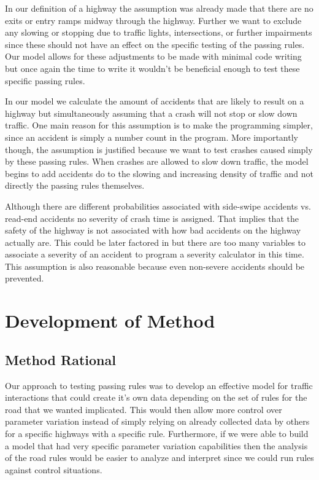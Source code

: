 \documentclass{amsart}
\begin{document}
		 In our definition of a highway the assumption was already made that there are no exits or entry ramps midway through the highway.  Further we want to exclude any slowing or stopping due to traffic lights, intersections, or further impairments since these should not have an effect on the specific testing of the passing rules.  Our model allows for these adjustments to be made with minimal code writing but once again the time to write it wouldn't be beneficial enough to test these specific passing rules.  

		In our model we calculate the amount of accidents that are likely to result on a highway but simultaneously assuming that a crash will not stop or slow down traffic.  One main reason for this assumption is to make the programming simpler, since an accident is simply a number count in the program.  More importantly though, the assumption is justified because we want to test crashes caused simply by these passing rules.  When crashes are allowed to slow down traffic, the model begins to add accidents do to the slowing and increasing density of traffic and not directly the passing rules themselves.  

	Although there are different probabilities associated with side-swipe accidents vs. read-end accidents no severity of crash time is assigned.  That implies that the safety of the highway is not associated with how bad accidents on the highway actually are.  This could be later factored in but there are too many variables to associate a severity of an accident to program a severity calculator in this time.  This assumption is also reasonable because even non-severe accidents should  be prevented. 
		


\section{\bfseries{Development of Method}}
	\subsection{Method Rational}
	Our approach to testing passing rules was to develop an effective model for traffic interactions that could create it's own data depending on the set of rules for the road that we wanted implicated.  This would then allow more control over parameter variation instead of simply relying on already collected data by others for a specific highways with a specific rule.  Furthermore, if we were able to build a model that had very specific parameter variation capabilities then the analysis of the road rules would be easier to analyze and interpret since we could run rules against control situations.  
	
\end{document}
